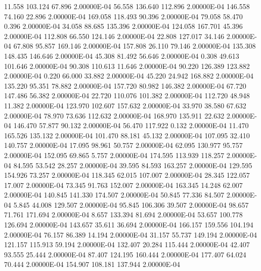     11.558   103.124    67.896  2.00000E-04
    56.558   136.640   112.896  2.00000E-04
   146.558    74.160    22.896  2.00000E-04
   169.058   118.493    90.396  2.00000E-04
    79.058    58.470     0.396  2.00000E-04
    34.058    88.685   135.396  2.00000E-04
   124.058   167.701    45.396  2.00000E-04
   112.808    66.550   124.146  2.00000E-04
    22.808   127.017    34.146  2.00000E-04
    67.808    95.857   169.146  2.00000E-04
   157.808    26.110    79.146  2.00000E-04
   135.308   148.435   146.646  2.00000E-04
    45.308    81.492    56.646  2.00000E-04
     0.308    49.613   101.646  2.00000E-04
    90.308   110.613    11.646  2.00000E-04
    90.220   126.389   123.882  2.00000E-04
     0.220    66.000    33.882  2.00000E-04
    45.220    24.942   168.882  2.00000E-04
   135.220    95.351    78.882  2.00000E-04
   157.720    80.982   146.382  2.00000E-04
    67.720   147.486    56.382  2.00000E-04
    22.720   110.076   101.382  2.00000E-04
   112.720    48.948    11.382  2.00000E-04
   123.970   102.607   157.632  2.00000E-04
    33.970    38.580    67.632  2.00000E-04
    78.970    73.636   112.632  2.00000E-04
   168.970   135.911    22.632  2.00000E-04
   146.470    57.877    90.132  2.00000E-04
    56.470   117.922     0.132  2.00000E-04
    11.470   165.526   135.132  2.00000E-04
   101.470    88.181    45.132  2.00000E-04
   107.095    32.410   140.757  2.00000E-04
    17.095    98.961    50.757  2.00000E-04
    62.095   130.977    95.757  2.00000E-04
   152.095    69.865     5.757  2.00000E-04
   174.595   113.939   118.257  2.00000E-04
    84.595    53.542    28.257  2.00000E-04
    39.595    84.593   163.257  2.00000E-04
   129.595   154.926    73.257  2.00000E-04
   118.345    62.015   107.007  2.00000E-04
    28.345   122.057    17.007  2.00000E-04
    73.345    91.763   152.007  2.00000E-04
   163.345    14.248    62.007  2.00000E-04
   140.845   141.330   174.507  2.00000E-04
    50.845    77.336    84.507  2.00000E-04
     5.845    44.008   129.507  2.00000E-04
    95.845   106.306    39.507  2.00000E-04
    98.657    71.761   171.694  2.00000E-04
     8.657   133.394    81.694  2.00000E-04
    53.657   100.778   126.694  2.00000E-04
   143.657    35.611    36.694  2.00000E-04
   166.157   159.556   104.194  2.00000E-04
    76.157    86.389    14.194  2.00000E-04
    31.157    55.737   149.194  2.00000E-04
   121.157   115.913    59.194  2.00000E-04
   132.407    20.284   115.444  2.00000E-04
    42.407    93.555    25.444  2.00000E-04
    87.407   124.195   160.444  2.00000E-04
   177.407    64.024    70.444  2.00000E-04
   154.907   108.181   137.944  2.00000E-04
